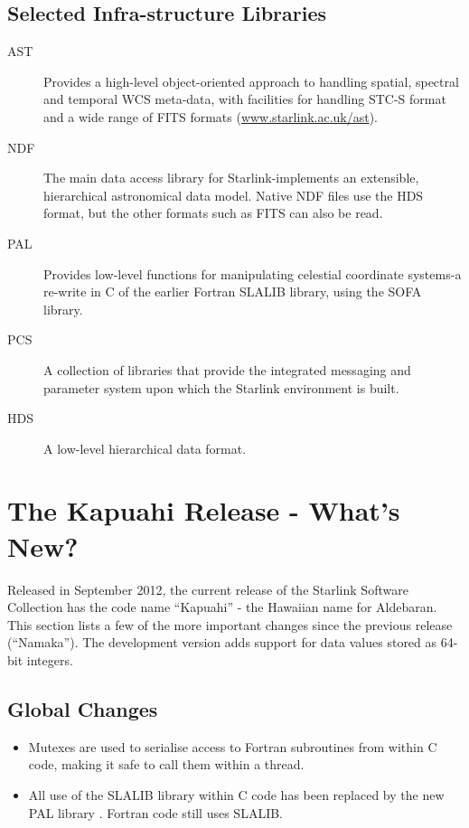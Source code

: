 \subsection{Selected Infra-structure Libraries}
\begin{description}
\item[AST] Provides a high-level object-oriented approach to handling spatial, spectral and temporal WCS meta-data, with facilities for handling STC-S format and a wide range of FITS formats
(\url{www.starlink.ac.uk/ast}).

\item[NDF] The main data access library for Starlink-implements an extensible, hierarchical astronomical data model. Native NDF files use the HDS format, but the other formats such as FITS can also be read.
\item[PAL] Provides low-level functions for manipulating celestial coordinate systems-a re-write in C of the earlier Fortran SLALIB library, using the SOFA library.
\item[PCS] A collection of libraries that provide the integrated messaging and parameter system upon which the Starlink environment is built.
\item[HDS] A low-level hierarchical data format.
\end{description}

\section{The Kapuahi Release - What's New?}
Released in September 2012, the current release of the Starlink Software Collection has the code name ``Kapuahi'' - the Hawaiian name for Aldebaran. This section lists a few of the more important changes since the previous release (``Namaka''). The development version adds support for data values stored as 64-bit integers.

\subsection{Global Changes}
\begin{itemize}
\item Mutexes are used to serialise access to Fortran subroutines from within C code, making it safe to call them within a thread.
\item All use of the SLALIB library within C code has been replaced by the new PAL library \citep{P56_adassxxii}. Fortran code still uses SLALIB.
\end{itemize}

